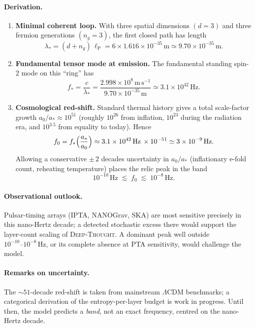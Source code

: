 \documentclass{article}
\begin{document}
\paragraph{Derivation.}

\begin{enumerate}
  \item \textbf{Minimal coherent loop.}  
        With three spatial dimensions \((d=3)\) and three fermion
        generations \((n_g=3)\), the first closed path has length  
        \[
          \lambda_* = (d+n_g)\,\ell_{\mathrm P} = 6 \times 1.616 \times 10^{-35}\,\mathrm{m}
                     \simeq 9.70 \times 10^{-35}\,\mathrm{m}.
        \]
  \item \textbf{Fundamental tensor mode at emission.}  
        The fundamental standing spin-2 mode on this “ring” has  
        \[
          f_* = \frac{c}{\lambda_*}
               = \frac{2.998\times10^{8}\,\mathrm{m\,s^{-1}}}
                      {9.70\times10^{-35}\,\mathrm{m}}
               \simeq 3.1 \times 10^{42}\,\mathrm{Hz}.
        \]
  \item \textbf{Cosmological red-shift.}  
        Standard thermal history gives a total scale-factor growth  
        \(a_0/a_* \approx 10^{51}\)  
        (roughly \(10^{26}\) from inflation, \(10^{23}\) during the
        radiation era, and \(10^{3.5}\) from equality to today).  Hence
        \[
          f_0 = f_* \Bigl(\frac{a_*}{a_0}\Bigr)
               \approx 3.1\times10^{42}\,\mathrm{Hz}\,\times 10^{-51}
               \simeq 3 \times 10^{-9}\,\mathrm{Hz}.
        \]
        Allowing a conservative \(\pm\,2\) decades uncertainty in
        \(a_0/a_*\) (inflationary e-fold count, reheating temperature)
        places the relic peak in the band
        \[
          10^{-10}\,\mathrm{Hz} \;\lesssim\; f_0 \;\lesssim\; 10^{-8}\,\mathrm{Hz}.
        \]
\end{enumerate}

\paragraph{Observational outlook.}
Pulsar-timing arrays (IPTA, NANOGrav, SKA) are most sensitive precisely
in this nano-Hertz decade; a detected stochastic excess there would
support the layer-count scaling of \textsc{Deep-Thought}. A dominant
peak well outside \(10^{-10}\text{–}10^{-8}\,\mathrm{Hz}\), or its
complete absence at PTA sensitivity, would challenge the model.

\paragraph{Remarks on uncertainty.}
The \(\sim 51\)-decade red-shift is taken from mainstream
\(\Lambda\mathrm{CDM}\) benchmarks; a categorical derivation of the
entropy-per-layer budget is work in progress.  Until then, the model
predicts a \emph{band}, not an exact frequency, centred on the
nano-Hertz decade.
\end{document}

